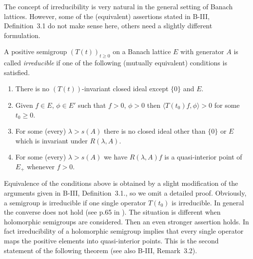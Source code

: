 The concept of irreducibility is very natural in the general setting of Banach lattices.
However, some of the (equivalent) assertions stated in B-III, Definition~3.1 do not make sense here, others need a slightly different formulation.
\begin{definition}\label{def:c3-3.1}
	
	A positive semigroup $(T(t))_{t\geq 0}$ on a Banach lattice $E$ with generator $A$ is called \emph{irreducible} if one of the following (mutually equivalent) conditions is satisfied.
	\begin{enumerate}[\upshape (a)]
	\item
	There is no $(T(t))$-invariant closed ideal except $\{0\}$ and $E$.
	
	\item 
	Given $f \in E$, $\phi \in E'$ such that $f > 0$, $\phi > 0$ then $\langle T(t_{0})f,\phi \rangle > 0$ for some $t_{0} \geq 0$.
	
    
	\item 
	For some (every) $\lambda > s(A)$ there is no closed ideal other than $\{0\}$ or $E$ which is invariant under $R(\lambda,A)$.
	
	\item 
	For some (every) $\lambda > s(A)$ we have $R(\lambda,A)f$ is a quasi-interior point of $E_{+}$ whenever $f > 0$.
	\end{enumerate}
\end{definition}
Equivalence of the conditions above is obtained by a slight modification of the arguments given in B-III, Definition~3.1.,
so we omit a detailed proof.
Obviously, a semigroup is irreducible if one single operator $T(t_{0})$ is irreducible.
In general the converse does not hold (see p.65 in \citet{greiner:1982}).
The situation is different when holomorphic semigroups are considered.
Then an even stronger assertion holds. In fact irreducibility of a holomorphic semigroup implies that every single operator maps the positive elements into quasi-interior points.
This is the second statement of the following theorem (see also B-III, Remark~3.2).

